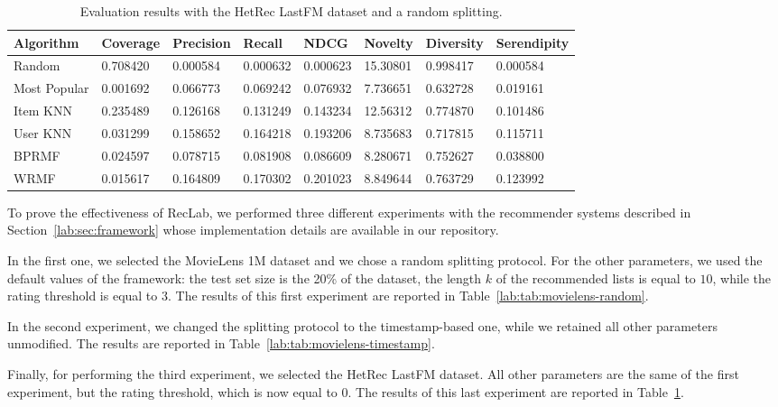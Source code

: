 \begin{table}
\centering
\begin{tabular}{@{}llllllll@{}}
\toprule
Algorithm    & Coverage & Precision & Recall   & NDCG     & Novelty  & Diversity & Serendipity \\ \midrule
Random       & 0.708420 & 0.000584  & 0.000632 & 0.000623 & 15.30801 & 0.998417  & 0.000584    \\
Most Popular & 0.001692 & 0.066773  & 0.069242 & 0.076932 & 7.736651 & 0.632728  & 0.019161    \\
Item KNN     & 0.235489 & 0.126168  & 0.131249 & 0.143234 & 12.56312 & 0.774870  & 0.101486    \\
User KNN     & 0.031299 & 0.158652  & 0.164218 & 0.193206 & 8.735683 & 0.717815  & 0.115711    \\
BPRMF        & 0.024597 & 0.078715  & 0.081908 & 0.086609 & 8.280671 & 0.752627  & 0.038800    \\
WRMF         & 0.015617 & 0.164809  & 0.170302 & 0.201023 & 8.849644 & 0.763729  & 0.123992    \\ \bottomrule
\end{tabular}
\caption[Evaluation with LastFM and random splitting]{Evaluation results with the HetRec LastFM dataset and a random splitting.}
\label{lab:tab:lastfm}
\end{table}

To prove the effectiveness of RecLab, we performed three different experiments with the recommender systems described in Section~\ref{lab:sec:framework} whose implementation details are available in our repository.

In the first one, we selected the MovieLens 1M dataset and we chose a random splitting protocol. For the other parameters, we used the default values of the framework: the test set size is the 20\% of the dataset, the length $k$ of the recommended lists is equal to $10$, while the rating threshold is equal to $3$. The results of this first experiment are reported in Table~\ref{lab:tab:movielens-random}.

In the second experiment, we changed the splitting protocol to the timestamp-based one, while we retained all other parameters unmodified. The results are reported in Table~\ref{lab:tab:movielens-timestamp}.

Finally, for performing the third experiment, we selected the HetRec LastFM dataset. All other parameters are the same of the first experiment, but the rating threshold, which is now equal to $0$. The results of this last experiment are reported in Table~\ref{lab:tab:lastfm}.

